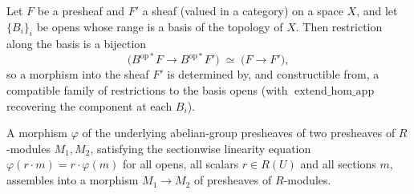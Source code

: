 \begin{lemma}
  \label{mk-lem:restrictHomEquivHom_mathlib}
  \mathlibok

  Let \(F\) be a presheaf and \(F'\) a sheaf (valued in a category) on a space \(X\),
  and let \(\{B_i\}_{i}\) be opens whose range is a basis of the topology of \(X\).
  Then restriction along the basis is a bijection
  \[
    \bigl(B^{\mathrm{op}*}F \longrightarrow B^{\mathrm{op}*}F'\bigr)
    \;\simeq\;
    \bigl(F \longrightarrow F'\bigr),
  \]
  so a morphism into the sheaf \(F'\) is determined by, and constructible from, a
  compatible family of restrictions to the basis opens (with
  \(\operatorname{extend\_hom\_app}\) recovering the component at each \(B_i\)).
\end{lemma}

\begin{lemma}
  \label{mk-lem:presheafOfModules_homMk_mathlib}
  \mathlibok

  A morphism \(\varphi\) of the underlying abelian-group presheaves of two presheaves
  of \(R\)-modules \(M_1, M_2\), satisfying the sectionwise linearity equation
  \(\varphi(r \cdot m) = r \cdot \varphi(m)\) for all opens, all scalars
  \(r \in R(U)\) and all sections \(m\), assembles into a morphism
  \(M_1 \to M_2\) of presheaves of \(R\)-modules.
\end{lemma}

